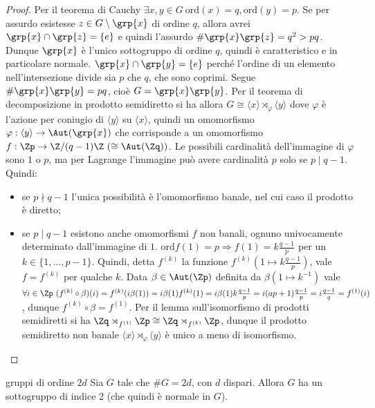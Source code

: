 \begin{proof}
    Per il teorema di Cauchy $\exists x,y \in G \ \text{ord}(x) = q, \text{ord}(y) = p$. Se per assurdo esistesse $z \in G \setminus \grp{x}$ di ordine $q$, allora avrei $\grp{x} \cap \grp{z} = \{e\}$ e quindi l'assurdo $\# \grp{x}\grp{z} = q^2 > pq$. Dunque $\grp{x}$ è l'unico sottogruppo di ordine $q$, quindi è caratteristico e in particolare normale.
    $\grp{x} \cap \grp{y} = \{e\}$ perché l'ordine di un elemento nell'intersezione divide sia $p$ che $q$, che sono coprimi. Segue $\#\grp{x}\grp{y} = pq$, cioè $G = \grp{x}\grp{y}$. Per il teorema di decomposizione in prodotto semidiretto si ha allora $G \cong \langle x \rangle \rtimes_{\varphi} \langle y \rangle$ dove $\varphi$ è l'azione per coniugio di $\langle y \rangle$ su $\langle x \rangle$,
    quindi un omomorfismo $\varphi : \langle y \rangle \rightarrow \Aut(\grp{x})$ che corrisponde a un omomorfismo $f : \Zp \to \Z/(q-1)\Z \ (\cong \Aut(\Zq))$.
    Le possibili cardinalità dell'immagine di $\varphi$ sono $1$ o $p$, ma per Lagrange l'immagine può avere cardinalità $p$ solo se $p \mid q-1$. Quindi:
    \begin{itemize}
        \item se $p \nmid q-1$ l'unica possibilità è l'omomorfismo banale, nel cui caso il prodotto è diretto;
        \item se $p \mid q-1$ esistono anche omomorfismi $f$ non banali, ognuno univocamente determinato dall'immagine di $1$. $\text{ord}f(1) = p \Rightarrow f(1) = k \frac{q-1}{p}$ per un $k \in \{1, \dots, p-1\}$. Quindi, detta $f^{(k)}$ la funzione $f^{(k)}(1 \mapsto k \frac{q-1}{p})$, vale $f = f^{(k)}$ per qualche $k$. Data $\beta \in \Aut(\Zp)$ definita da $\beta(1 \mapsto k^{-1})$ vale $\forall i \in \Zp \ (f^{(k)} \circ \beta)(i) = f^{(k)}(i \beta(1)) = i\beta(1)f^{(k)}(1) = i\beta(1)k\frac{q-1}{p} = i (ap + 1) \frac{q-1}{p} = i \frac{q-1}{q} = f^{(1)}(i)$, dunque $f^{(k)} \circ \beta = f^{(1)}$. Per il lemma sull'isomorfismo di prodotti semidiretti si ha $\Zq \rtimes_{f^{(1)}} \Zp \cong \Zq \rtimes_{f^{(k)}} \Zp$, dunque il prodotto semidiretto non banale $\langle x \rangle \rtimes_\varphi \langle y \rangle$ è unico a meno di isomorfismo.
    \end{itemize}
\end{proof}
\begin{proposition}{gruppi di ordine $2d$}
    Sia $G$ tale che $\#G = 2d$, con $d$ dispari. Allora $G$ ha un sottogruppo di indice 2 (che quindi è normale in $G$).
\end{proposition}
